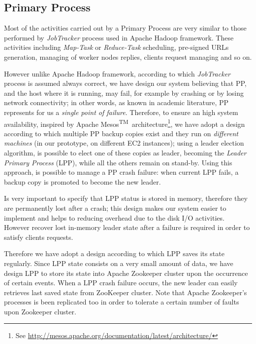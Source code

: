 \documentclass[sigchi]{acmart}
\begin{document}
\subsection{Primary Process}

Most of the activities carried out by a Primary Process are very similar to those performed by \textit{JobTracker} process used in Apache Hadoop framework. These activities including \textit{Map-Task} or \textit{Reduce-Task} scheduling, pre-signed URLs generation, managing of worker nodes replies, clients request managing and so on.

However unlike Apache Hadoop framework, according to which \textit{JobTracker} process is assumed always correct, we have design our system believing that PP, and the host where it is running, may fail, for example by crashing or by losing network connectivity; in other words, as known in academic literature, PP represents for us a \textit{single point of failure}. Therefore, to ensure an high system availability, inspired by Apache Mesos\textsuperscript{TM}\ architecture\footnote{See \url{http://mesos.apache.org/documentation/latest/architecture/}}, we have adopt a design according to which multiple PP backup copies exist and they run on \textit{different machines} (in our prototype, on different EC2 instances); using a leader election algorithm, is possible to elect one of these copies as leader, becoming the \textit{Leader Primary Process} (LPP), while all the others remain on stand-by. Using this approach, is possible to manage a PP crash failure: when current LPP fails, a backup copy is promoted to become the new leader. 

Is very important to specify that LPP status is stored in memory, therefore they are permanently lost after a crash; this design makes our system easier to implement and helps to reducing overhead due to the disk I/O activities. However recover lost in-memory leader state after a failure is required in order to satisfy clients requests. 

Therefore we have adopt a design according to which LPP saves its state regularly. Since LPP state consists on a very small amount of data, we have design LPP to store its state into Apache Zookeeper cluster upon the occurrence of certain events. When a LPP crash failure occurs, the new leader can easily retrieves last saved state from  ZooKeeper cluster. Note that Apache Zookeeper's processes is been replicated too in order to tolerate a certain number of faults upon Zookeeper cluster.
\end{document}
